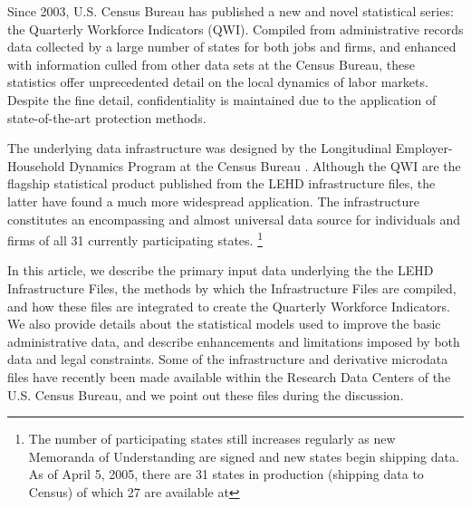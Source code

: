                       
%
%

Since 2003, U.S. Census Bureau has published a new and novel statistical
series: the Quarterly Workforce Indicators (QWI). Compiled from
administrative records data collected by a large number of states for both
jobs and firms, and enhanced with information culled from other data sets at
the Census Bureau, these statistics offer unprecedented detail on the local
dynamics of labor markets. Despite the fine detail, confidentiality is
maintained due to the application of state-of-the-art protection methods.

The underlying data infrastructure was designed by the Longitudinal
Employer-Household Dynamics Program at the Census Bureau 
\citep{AbowdEtAl2004}. Although the QWI are the flagship
statistical product published from the LEHD infrastructure files, the latter
have found a much more widespread application. The infrastructure
constitutes an encompassing and almost universal data source for individuals
and firms of all 31 currently participating states.%
%
\footnote{%
The number of participating states still increases regularly as new Memoranda of
Understanding are signed and new states begin shipping data. As of April 5,
2005, there are 31 states in production (shipping data to Census) of which
27 are available at }

In this article, we describe the primary input data underlying the the LEHD
Infrastructure Files, the methods by which the Infrastructure Files are
compiled, and how these files are integrated to create the Quarterly
Workforce Indicators. We also provide details about the statistical models
used to improve the basic administrative data, and describe enhancements and
limitations imposed by both data and legal constraints. Some of the
infrastructure and derivative microdata files have recently been made
available within the Research Data Centers of the U.S. Census Bureau, and we
point out these files during the discussion.

